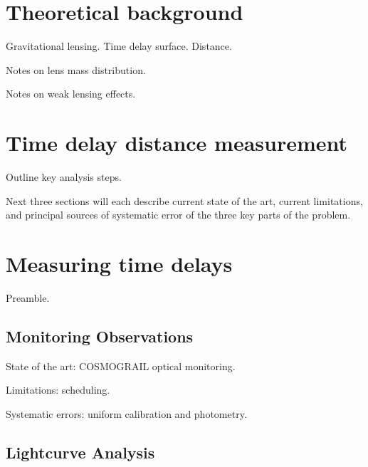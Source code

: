
\section{Theoretical background}
\label{sec:theory}

Gravitational lensing. Time delay surface. Distance.

Notes on lens mass distribution.

Notes on weak lensing effects.


\section{Time delay distance measurement}
\label{sec:overview}

Outline key analysis steps.

Next three sections will each describe current state of the art,
current limitations, and principal sources of systematic error
of the three key parts of the problem.


\section{Measuring time delays}
\label{sec:timedelay}

Preamble.


\subsection{Monitoring Observations}

State of the art: COSMOGRAIL optical monitoring.

Limitations: scheduling.

Systematic errors: uniform calibration and photometry.


\subsection{Lightcurve Analysis}

